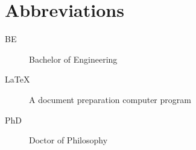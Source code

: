 \chapter*{Abbreviations}\label{abbr}
\begin{description}
\item[BE] Bachelor of Engineering
\item[\LaTeX] A document preparation computer program
\item[PhD] Doctor of Philosophy
\end{description}
